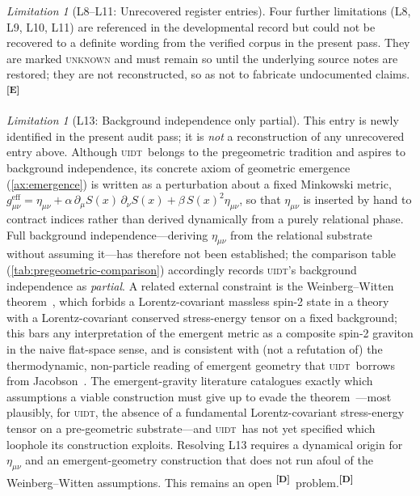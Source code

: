 \documentclass[12pt,a4paper,twoside]{article}
\theoremstyle{plain}
\theoremstyle{definition}
\theoremstyle{remark}
\newtheorem{limitation}[theorem]{Limitation}
\newcommand{\UIDT}{\textsc{uidt}}
\newcommand{\catmark}[1]{\textsuperscript{\textsf{\textbf{[#1]}}}}
\newcommand{\Sx}{S(x)}
\begin{document}
\begin{limitation}[L8--L11: Unrecovered register entries]
\label{lim:L8toL11}
Four further limitations (L8, L9, L10, L11) are referenced in the developmental record but could not be recovered to a definite wording from the verified corpus in the present pass. They are marked \textsc{unknown} and must remain so until the underlying source notes are restored; they are not reconstructed, so as not to fabricate undocumented claims.\catmark{E}
\end{limitation}

\begin{limitation}[L13: Background independence only partial]
\label{lim:L13}
This entry is newly identified in the present audit pass; it is \emph{not} a reconstruction of any unrecovered entry above. Although \UIDT\ belongs to the pregeometric tradition and aspires to background independence, its concrete axiom of geometric emergence (\cref{ax:emergence}) is written as a perturbation about a fixed Minkowski metric, $g_{\mu\nu}^{\mathrm{eff}}=\eta_{\mu\nu}+\alpha\,\partial_\mu\Sx\,\partial_\nu\Sx+\beta\,\Sx^2\eta_{\mu\nu}$, so that $\eta_{\mu\nu}$ is inserted by hand to contract indices rather than derived dynamically from a purely relational phase. Full background independence---deriving $\eta_{\mu\nu}$ from the relational substrate without assuming it---has therefore not been established; the comparison table (\cref{tab:pregeometric-comparison}) accordingly records \UIDT's background independence as \emph{partial}. A related external constraint is the Weinberg--Witten theorem~\cite{weinbergwitten1980}, which forbids a Lorentz-covariant massless spin-2 state in a theory with a Lorentz-covariant conserved stress-energy tensor on a fixed background; this bars any interpretation of the emergent metric as a composite spin-2 graviton in the naive flat-space sense, and is consistent with (not a refutation of) the thermodynamic, non-particle reading of emergent geometry that \UIDT\ borrows from Jacobson~\cite{jacobson1995}. The emergent-gravity literature catalogues exactly which assumptions a viable construction must give up to evade the theorem~\cite{jenkins2009,carlip2014}---most plausibly, for \UIDT, the absence of a fundamental Lorentz-covariant stress-energy tensor on a pre-geometric substrate---and \UIDT\ has not yet specified which loophole its construction exploits. Resolving L13 requires a dynamical origin for $\eta_{\mu\nu}$ and an emergent-geometry construction that does not run afoul of the Weinberg--Witten assumptions. This remains an open \catmark{D}\ problem.\catmark{D}
\end{limitation}
\end{document}
